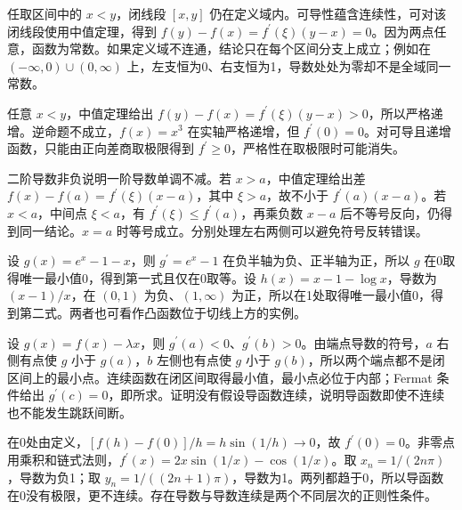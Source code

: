 \documentclass[12pt,fontset=fandol]{ctexart}
\begin{document}
\begin{solve}\label{ans:c7q11}
任取区间中的 $x<y$，闭线段 $[x,y]$ 仍在定义域内。可导性蕴含连续性，可对该闭线段使用中值定理，得到 $f(y)-f(x)=f^{\prime}(\xi)(y-x)=0$。因为两点任意，函数为常数。如果定义域不连通，结论只在每个区间分支上成立；例如在 $(-\infty,0)\cup(0,\infty)$ 上，左支恒为0、右支恒为1，导数处处为零却不是全域同一常数。
\end{solve}

\begin{solve}\label{ans:c7q12}
任意 $x<y$，中值定理给出 $f(y)-f(x)=f^{\prime}(\xi)(y-x)>0$，所以严格递增。逆命题不成立，$f(x)=x^3$ 在实轴严格递增，但 $f^{\prime}(0)=0$。对可导且递增函数，只能由正向差商取极限得到 $f^{\prime}\ge0$，严格性在取极限时可能消失。
\end{solve}

\begin{solve}\label{ans:c7q13}
二阶导数非负说明一阶导数单调不减。若 $x>a$，中值定理给出差 $f(x)-f(a)=f^{\prime}(\xi)(x-a)$，其中 $\xi>a$，故不小于 $f^{\prime}(a)(x-a)$。若 $x<a$，中间点 $\xi<a$，有 $f^{\prime}(\xi)\le f^{\prime}(a)$，再乘负数 $x-a$ 后不等号反向，仍得到同一结论。$x=a$ 时等号成立。分别处理左右两侧可以避免符号反转错误。
\end{solve}

\begin{solve}\label{ans:c7q14}
设 $g(x)=e^x-1-x$，则 $g^{\prime}=e^x-1$ 在负半轴为负、正半轴为正，所以 $g$ 在0取得唯一最小值0，得到第一式且仅在0取等。设 $h(x)=x-1-\log x$，导数为 $(x-1)/x$，在 $(0,1)$ 为负、$(1,\infty)$ 为正，所以在1处取得唯一最小值0，得到第二式。两者也可看作凸函数位于切线上方的实例。
\end{solve}

\begin{solve}\label{ans:c7q15}
设 $g(x)=f(x)-\lambda x$，则 $g^{\prime}(a)<0$、$g^{\prime}(b)>0$。由端点导数的符号，$a$ 右侧有点使 $g$ 小于 $g(a)$，$b$ 左侧也有点使 $g$ 小于 $g(b)$，所以两个端点都不是闭区间上的最小点。连续函数在闭区间取得最小值，最小点必位于内部；Fermat 条件给出 $g^{\prime}(c)=0$，即所求。证明没有假设导函数连续，说明导函数即使不连续也不能发生跳跃间断。
\end{solve}

\begin{solve}\label{ans:c7q16}
在0处由定义，$[f(h)-f(0)]/h=h\sin(1/h)\to0$，故 $f^{\prime}(0)=0$。非零点用乘积和链式法则，$f^{\prime}(x)=2x\sin(1/x)-\cos(1/x)$。取 $x_n=1/(2n\pi)$，导数为负1；取 $y_n=1/((2n+1)\pi)$，导数为1。两列都趋于0，所以导函数在0没有极限，更不连续。存在导数与导数连续是两个不同层次的正则性条件。
\end{solve}
\end{document}

